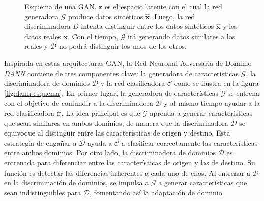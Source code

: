 \begin{figure}[H]

    \caption[Esquema de una GAN]{Esquema de una GAN. $\mathbf{z}$ es el espacio latente con el cual la red generadora $\mathcal{G}$ produce datos sintéticos $\hat{\mathbf{x}}$. Luego, la red discriminadora $D$ intenta distinguir entre los datos sintéticos $\hat{\mathbf{x}}$ y los datos reales $\mathbf{x}$. Con el tiempo, $\mathcal{G}$ irá generando datos similares a los reales y $\mathcal{D}$ no podrá distinguir los unos de los otros.}
    \label{fig:gan-esquema}
\end{figure}

Inspirada en estas arquitecturas GAN, la Red Neuronal Adversaria de Dominio {\it DANN} \parencite{ganin2016domain} contiene de tres componentes clave: la generadora de características $\mathcal{G}$, la
discriminadora de dominios $\mathcal{D}$ y la red clasificadora $\mathcal{C}$ como se ilustra en la figura
\ref{fig:dann-esquema}. En primer lugar, la generadora de características $\mathcal{G}$ se entrena con el objetivo de
confundir a la discriminadora $\mathcal{D}$ y al mismo tiempo ayudar a la red clasificadora $\mathcal{C}$. La idea
principal es que $\mathcal{G}$ aprenda a generar características que sean similares en ambos dominios, de manera que la
discriminadora $\mathcal{D}$ se equivoque al distinguir entre las características de origen y destino. Esta estrategia
de engañar a $\mathcal{D}$ ayuda a $\mathcal{C}$ a clasificar correctamente las características entre ambos dominios.
Por otro lado, la discriminadora de dominios $\mathcal{D}$ es entrenada para diferenciar entre las características de
origen y las de destino. Su función es detectar las diferencias inherentes a cada uno de ellos. Al entrenar a
$\mathcal{D}$ en la discriminación de dominios, se impulsa a $\mathcal{G}$ a generar características que sean
indistinguibles para $\mathcal{D}$, fomentando así la adaptación de dominio.

